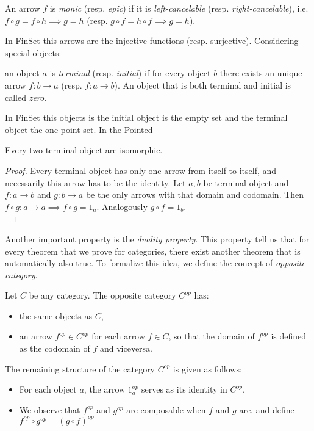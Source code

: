 \begin{definition} An arrow $f$ is  \emph{monic} (resp. \emph{epic}) if it is \emph{left-cancelable} (resp. \emph{right-cancelable}), i.e.  $f\circ g = f \circ h \implies g = h$ (resp. $g\circ f = h \circ f \implies g = h$).
\end{definition}


 
In FinSet this arrows are the injective functions (resp. surjective). Considering special objects:

\begin{definition}
  an object $a$ is \emph{terminal} (resp. \emph{initial}) if for every object $b$ there exists an unique arrow $f:b\to a$ (resp. $f:a\to b$).  An object that is both terminal and initial is called \emph{zero}.
\end{definition}

  In FinSet this objects is the initial object is the  empty set and the terminal object the one point set. In the Pointed 

\begin{proposition}\label{terminal-proposition}
  Every two terminal object are isomorphic.
\end{proposition}
\begin{proof}
 Every terminal object has only one arrow from itself to itself, and necessarily this arrow has to be the identity. Let $a, b$ be terminal object and $f:a\to b$ and $g:b\to a$ be the only arrows with that domain and codomain. Then $f\circ g : a \to a \implies f \circ g = 1_a$. Analogously $g \circ f = 1_b$.\\
\end{proof}

Another important property is the \emph{duality property}. This property tell us that for every theorem that we prove for categories, there exist another theorem that is automatically also true. To formalize this idea, we define the concept of \emph{opposite category}.


\begin{definition}\cite[Definition 1.2.1]{riehl2017category}
  Let $C$ be any category. The opposite category $C^{op}$ has:
  \begin{itemize}
  \item the same objects as $C$,
  \item an arrow $f^{op}\in C^{op}$ for each arrow $f \in C$, so that the domain of $f^{op}$ is defined as the codomain of $f$ and viceversa.
  \end{itemize}
  The remaining structure of the category $C^{op}$ is given as follows:
  \begin{itemize}
  \item For each object $a$, the arrow $1_a^{op}$ serves as its identity in $C^{op}$.
  \item We observe that $f^{op}$ and $g^{op}$ are composable when $f$ and $g$ are, and define $f^{op} \circ g^{op} = (g \circ f)^{op}$
  \end{itemize}
\end{definition}


